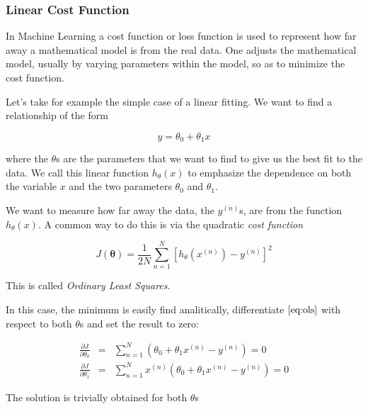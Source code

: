 \documentclass[11pt]{article}
\begin{document}
\hypertarget{linear-cost-function}{%
\subsubsection{Linear Cost Function}\label{linear-cost-function}}

In Machine Learning a cost function or loss function is used to
represent how far away a mathematical model is from the real data. One
adjusts the mathematical model, usually by varying parameters within the
model, so as to minimize the cost function.

Let's take for example the simple case of a linear fitting. We want to
find a relationship of the form

\begin{equation}
y=\theta_0 +\theta_1x
\end{equation}

where the \(\theta\)s are the parameters that we want to find to give us
the best fit to the data. We call this linear function \(h_\theta(x)\)
to emphasize the dependence on both the variable \(x\) and the two
parameters \(\theta_0\) and \(\theta_1\).

We want to measure how far away the data, the \(y^{(n)}\)s, are from the
function \(h_\theta(x)\). A common way to do this is via the quadratic
\emph{cost function}

\begin{equation}
J(\mathbf{\theta}) = \frac{1}{2N} \sum\limits_{n=1}^N \left[ h_\theta \left( x^{(n)} \right) - y^{(n)} \right]^2
\label{eq:ols}
\end{equation}

This is called \emph{Ordinary Least Squares}.

In this case, the minimum is easily find analitically, differentiate
\(\eqref{eq:ols}\) with respect to both \(\theta\)s and set the result
to zero:

\begin{equation}
\begin{array}{lcl} 
\frac{\partial J}{\partial \theta_0} & = & \sum\limits_{n=1}^N \left( \theta_0 + \theta_1 x^{(n)} - y^{(n)} \right) = 0 
\\ 
\frac{\partial J}{\partial \theta_1} & = & \sum\limits_{n=1}^N x^{(n)} \left( \theta_0 + \theta_1 x^{(n)} - y^{(n)} \right) = 0 
\end{array}
\end{equation}

The solution is trivially obtained for both \(\theta\)s
\end{document}
